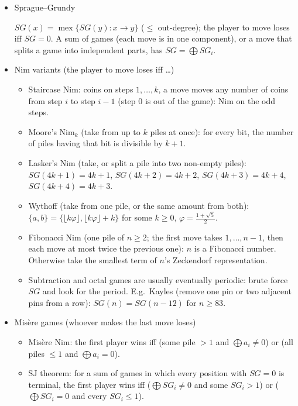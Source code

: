 \begin{itemize}
\item Sprague–Grundy

$SG(x) = \operatorname{mex}\{SG(y) : x \to y\}$ ($\le$ out-degree); the player to move loses iff $SG = 0$. A sum of games (each move is in one component), or a move that splits a game into independent parts, has $SG = \bigoplus SG_i$.

\item Nim variants (the player to move loses iff \ldots)
\begin{itemize}
  \item Staircase Nim: coins on steps $1, \ldots, k$, a move moves any number of coins from step $i$ to step $i - 1$ (step $0$ is out of the game): Nim on the odd steps.
  \item Moore's Nim$_k$ (take from up to $k$ piles at once): for every bit, the number of piles having that bit is divisible by $k + 1$.
  \item Lasker's Nim (take, or split a pile into two non-empty piles): $SG(4k+1) = 4k+1$, $SG(4k+2) = 4k+2$, $SG(4k+3) = 4k+4$, $SG(4k+4) = 4k+3$.
  \item Wythoff (take from one pile, or the same amount from both): $\{a, b\} = \{\lfloor k\varphi \rfloor, \lfloor k\varphi \rfloor + k\}$ for some $k \ge 0$, $\varphi = \frac{1+\sqrt5}{2}$.
  \item Fibonacci Nim (one pile of $n \ge 2$; the first move takes $1, \ldots, n-1$, then each move at most twice the previous one): $n$ is a Fibonacci number. Otherwise take the smallest term of $n$'s Zeckendorf representation.
  \item Subtraction and octal games are usually eventually periodic: brute force $SG$ and look for the period. E.g.\ Kayles (remove one pin or two adjacent pins from a row): $SG(n) = SG(n - 12)$ for $n \ge 83$.
\end{itemize}

\item Misère games (whoever makes the last move loses)
\begin{itemize}
  \item Misère Nim: the first player wins iff (some pile $> 1$ and $\bigoplus a_i \ne 0$) or (all piles $\le 1$ and $\bigoplus a_i = 0$).
  \item SJ theorem: for a sum of games in which every position with $SG = 0$ is terminal, the first player wins iff ($\bigoplus SG_i \ne 0$ and some $SG_i > 1$) or ($\bigoplus SG_i = 0$ and every $SG_i \le 1$).
\end{itemize}


\end{itemize}
